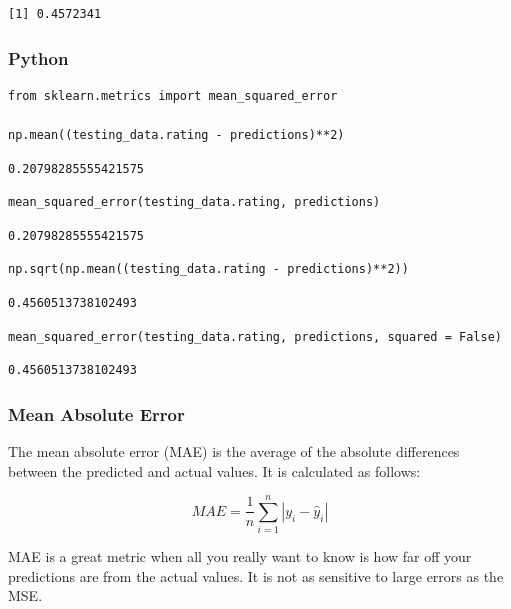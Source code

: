 \documentclass[
  letterpaper,
]{krantz}
\begin{document}
\begin{verbatim}
[1] 0.4572341
\end{verbatim}

\subsubsection{Python}

\begin{verbatim}
from sklearn.metrics import mean_squared_error

np.mean((testing_data.rating - predictions)**2)
\end{verbatim}

\begin{verbatim}
0.20798285555421575
\end{verbatim}

\begin{verbatim}
mean_squared_error(testing_data.rating, predictions)
\end{verbatim}

\begin{verbatim}
0.20798285555421575
\end{verbatim}

\begin{verbatim}
np.sqrt(np.mean((testing_data.rating - predictions)**2))
\end{verbatim}

\begin{verbatim}
0.4560513738102493
\end{verbatim}

\begin{verbatim}
mean_squared_error(testing_data.rating, predictions, squared = False)
\end{verbatim}

\begin{verbatim}
0.4560513738102493
\end{verbatim}

\subsubsection{Mean Absolute Error}\label{sec-knowing-metrics-mae}

The mean absolute error (MAE) is the average of the absolute differences
between the predicted and actual values. It is calculated as follows:

\[MAE = \frac{1}{n}\sum_{i=1}^{n}|y_i - \hat{y}_i|\]

MAE is a great metric when all you really want to know is how far off
your predictions are from the actual values. It is not as sensitive to
large errors as the MSE.
\end{document}
